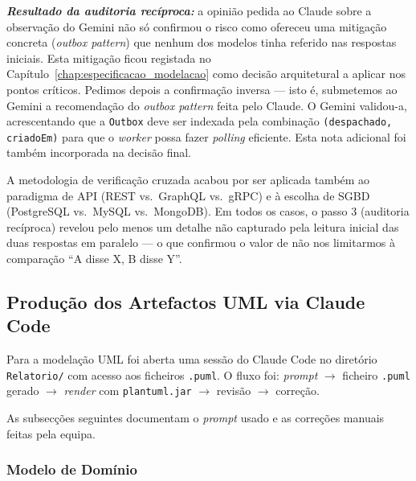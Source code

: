 \noindent\textit{\textbf{Resultado da auditoria recíproca:}} a opinião pedida ao Claude sobre a observação do Gemini não só confirmou o risco como ofereceu uma mitigação concreta (\textit{outbox pattern}) que nenhum dos modelos tinha referido nas respostas iniciais. Esta mitigação ficou registada no Capítulo~\ref{chap:especificacao_modelacao} como decisão arquitetural a aplicar nos pontos críticos. Pedimos depois a confirmação inversa --- isto é, submetemos ao Gemini a recomendação do \textit{outbox pattern} feita pelo Claude. O Gemini validou-a, acrescentando que a \texttt{Outbox} deve ser indexada pela combinação \texttt{(despachado, criadoEm)} para que o \textit{worker} possa fazer \textit{polling} eficiente. Esta nota adicional foi também incorporada na decisão final.

A metodologia de verificação cruzada acabou por ser aplicada também ao paradigma de API (REST vs.\ GraphQL vs.\ gRPC) e à escolha de SGBD (PostgreSQL vs.\ MySQL vs.\ MongoDB). Em todos os casos, o passo 3 (auditoria recíproca) revelou pelo menos um detalhe não capturado pela leitura inicial das duas respostas em paralelo --- o que confirmou o valor de não nos limitarmos à comparação ``A disse X, B disse Y''.

\subsection{Produção dos Artefactos UML via Claude Code}\label{subsec:ia_arq_diagramas}

Para a modelação UML foi aberta uma sessão do Claude Code no diretório \texttt{Relatorio/} com acesso aos ficheiros \texttt{.puml}. O fluxo foi: \textit{prompt} $\rightarrow$ ficheiro \texttt{.puml} gerado $\rightarrow$ \textit{render} com \texttt{plantuml.jar} $\rightarrow$ revisão $\rightarrow$ correção.

As subsecções seguintes documentam o \textit{prompt} usado e as correções manuais feitas pela equipa.

\subsubsection*{Modelo de Domínio}


